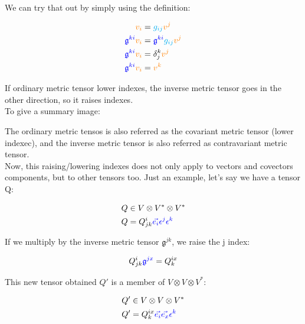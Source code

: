 We can try that out by simply using the definition:

\begin{align*}
    \begingroup\color{orange}v_i\endgroup &= \begingroup\color{cyan}g_{ij}\endgroup \begingroup\color{orange}v^j\endgroup\\
    \begingroup\color{blue}\mathfrak{g}^{ki}\endgroup \begingroup\color{orange}v_i\endgroup &= \begingroup\color{blue}\mathfrak{g}^{ki}\endgroup \begingroup\color{cyan}g_{ij}\endgroup \begingroup\color{orange}v^j\endgroup\\
    \begingroup\color{blue}\mathfrak{g}^{ki}\endgroup \begingroup\color{orange}v_i\endgroup &= \delta^k_j \begingroup\color{orange}v^j\endgroup\\
    \begingroup\color{blue}\mathfrak{g}^{ki}\endgroup \begingroup\color{orange}v_i\endgroup &= \begingroup\color{orange}v^k\endgroup
\end{align*}

If ordinary metric tensor lower indexes, the inverse metric tensor goes in the other direction, so it raises indexes.\\
To give a summary image:

\begin{center}

\end{center}

The ordinary metric tensos is also referred as the covariant metric tensor (lower indexec), and the inverse
metric tensor is also referred as contravariant metric tensor.\\

Now, this raising/lowering indexes does not only apply to vectors and covectors components, but to other tensors too.
Just an example, let's say we have a tensor Q:

\begin{align*}
    Q &\in V \otimes V^* \otimes V^*\\
    Q &= Q^i_{jk} \begingroup\color{blue}\vec{e_i}\epsilon^j\epsilon^k\endgroup
\end{align*}

If we multiply by the inverse metric tensor $\mathfrak{g}^{jk}$, we raise the j index:

\begin{equation}
    Q^i_{jk} \begingroup\color{blue}\mathfrak{g}^{jx}\endgroup = Q^{ix}_k
\end{equation}

This new tensor obtained $Q'$ is a member of $V \otimes V \otimes V^*$:

\begin{align*}
    Q' &\in V \otimes V \otimes V^*\\
    Q' &= Q^{ix}_k \begingroup\color{blue}\vec{e_i}\vec{e_x}\epsilon^k\endgroup
\end{align*}